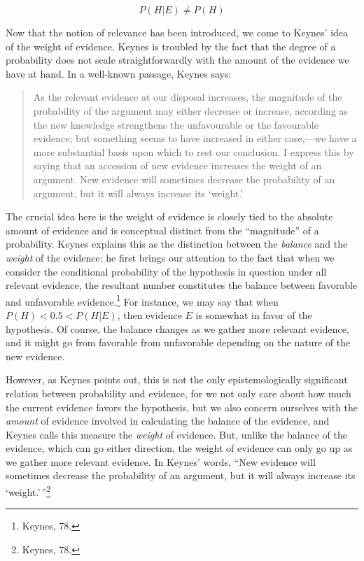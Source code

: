 \[P(H|E ) \neq P(H) \]

Now that the notion of relevance has been introduced, we come to Keynes'
idea of the weight of evidence. Keynes is troubled by the fact that the
degree of a probability does not scale straightforwardly with the amount
of the evidence we have at hand. In a well-known passage, Keynes says:

\begin{quote}
As the relevant evidence at our disposal increases, the magnitude of the
probability of the argument may either decrease or increase, according
as the new knowledge strengthens the unfavourable or the favourable
evidence; but something seems to have increased in either case,---we
have a more substantial basis upon which to rest our conclusion. I
express this by saying that an accession of new evidence increases the
weight of an argument. New evidence will sometimes decrease the
probability of an argument, but it will always increase its `weight.'
\end{quote}

The crucial idea here is the weight of evidence is closely tied to the
absolute amount of evidence and is conceptual distinct from the
``magnitude'' of a probability. Keynes explains this as the distinction
between the \emph{balance} and the \emph{weight} of the evidence: he
first brings our attention to the fact that when we consider the
conditional probability of the hypothesis in question under all relevant
evidence, the resultant number constitutes the balance between favorable
and unfavorable evidence.\footnote{Keynes, 78.} For instance, we may say
that when \(P(H)<0.5 <P(H|E)\), then evidence \(E\) is somewhat in favor
of the hypothesis. Of course, the balance changes as we gather more
relevant evidence, and it might go from favorable from unfavorable
depending on the nature of the new evidence.

However, as Keynes points out, this is not the only epistemologically
significant relation between probability and evidence, for we not only
care about how much the current evidence favors the hypothesis, but we
also concern ourselves with the \emph{amount} of evidence involved in
calculating the balance of the evidence, and Keynes calls this measure
the \emph{weight} of evidence. But, unlike the balance of the evidence,
which can go either direction, the weight of evidence can only go up as
we gather more relevant evidence. In Keynes' words, ``New evidence will
sometimes decrease the probability of an argument, but it will always
increase its `weight.'\,''\footnote{Keynes, 78.}

